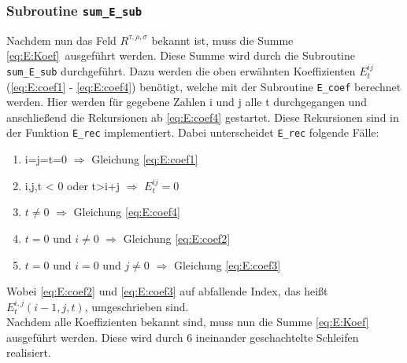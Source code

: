 \subsubsection{Subroutine \texttt{sum\_E\_sub}}
%
Nachdem nun das Feld $R^{\tau,\rho,\sigma}$ bekannt ist, muss die Summe 
\ref{eq:E:Koef}\  ausgeführt werden. Diese Summe wird durch die Subroutine 
\texttt{sum\_E\_sub} durchgeführt. Dazu werden die oben erwähnten Koeffizienten 
$E^{ij}_t$ (\ref{eq:E:coef1} - \ref{eq:E:coef4}) benötigt, welche mit der 
Subroutine \texttt{E\_coef} berechnet werden. Hier werden für gegebene Zahlen i 
und j 
alle t durchgegangen und anschließend die Rekursionen ab \ref{eq:E:coef4} 
gestartet. Diese Rekursionen sind in der Funktion \texttt{E\_rec} 
implementiert. Dabei 
unterscheidet \texttt{E\_rec} folgende Fälle:
\begin{enumerate}
	\item i=j=t=0 $\Rightarrow$ Gleichung \ref{eq:E:coef1}
	\item i,j,t < 0 oder t>i+j $\Rightarrow$ $E^{ij}_t=0$
	\item $t\neq0$ $\Rightarrow$ Gleichung \ref{eq:E:coef4}
	\item $t=0$ und $i\neq0$ $\Rightarrow$ Gleichung \ref{eq:E:coef2}
	\item $t=0$ und $i=0$ und $j\neq0$ $\Rightarrow$ Gleichung \ref{eq:E:coef3}
\end{enumerate}
Wobei \ref{eq:E:coef2} und \ref{eq:E:coef3} auf abfallende Index, das heißt 
$E^{i,j}_t(i-1,j,t)$,  umgeschrieben sind.   \\
Nachdem alle Koeffizienten bekannt sind, muss nun die Summe \ref{eq:E:Koef} 
ausgeführt werden. Diese wird durch 6 ineinander geschachtelte Schleifen 
realisiert. 
%
%
%
